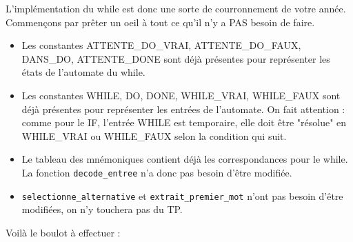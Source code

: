 \documentclass[10pt]{article}
\begin{document}
\begin{enumerate}[label=\textbf{[\alph*]}]
\begin{center}
\end{center}

\item L'implémentation du while est donc une sorte de courronnement de
  votre année. Commençons par prêter un oeil à tout ce qu'il n'y a PAS
  besoin de faire.

  \begin{itemize}
  \item Les constantes ATTENTE\_DO\_VRAI, ATTENTE\_DO\_FAUX, DANS\_DO,
    ATTENTE\_DONE sont déjà présentes pour représenter les états de
    l'automate du while.
  \item Les constantes WHILE, DO, DONE, WHILE\_VRAI, WHILE\_FAUX sont
    déjà présentes pour représenter les entrées de l'automate. On fait
    attention : comme pour le IF, l'entrée WHILE est temporaire, elle
    doit être "résolue" en WHILE\_VRAI ou WHILE\_FAUX selon la condition
    qui suit.
  \item Le tableau des mnémoniques contient déjà les correspondances
    pour le while. La fonction \texttt{decode\_entree} n'a donc pas
    besoin d'être modifiée.
  \item \texttt{selectionne\_alternative} et
    \texttt{extrait\_premier\_mot} n'ont pas besoin d'être modifiées,
    on n'y touchera pas du TP.

  \end{itemize}

  Voilà le boulot à effectuer :


\end{enumerate}
\end{document}
